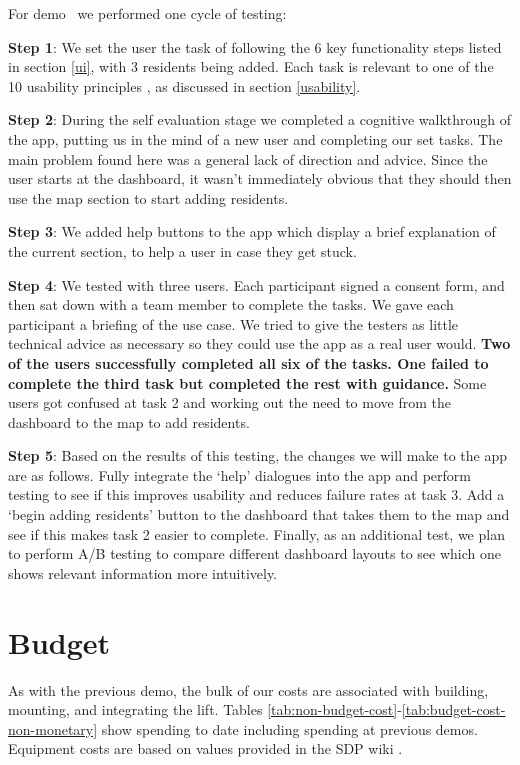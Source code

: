 \documentclass{article}
\begin{document}
For demo \demoNumber\ we performed one cycle of testing:

{\bf Step 1}: We set the user the task of following the 6 key functionality steps listed in section \ref{ui}, with 3 residents being added. Each task is relevant to one of the 10 usability principles \cite{heuristics}, as discussed in section \ref{usability}.

{\bf Step 2}: During the self evaluation stage we completed a cognitive walkthrough of the app, putting us in the mind of a new user and completing our set tasks. The main problem found here was a general lack of direction and advice. Since the user starts at the dashboard, it wasn't immediately obvious that they should then use the map section to start adding residents.

{\bf Step 3}: We added help buttons to the app which display a brief explanation of the current section, to help a user in case they get stuck.

{\bf Step 4}: We tested with three users. Each participant signed a consent form, and then sat down with a team member to complete the tasks. We gave each participant a briefing of the use case. We tried to give the testers as little technical advice as necessary so they could use the app as a real user would. {\bf Two of the users successfully completed all six of the tasks. One failed to complete the third task but completed the rest with guidance.} Some users got confused at task 2 and working out the need to move from the dashboard to the map to add residents.

{\bf Step 5}: Based on the results of this testing, the changes we will make to the app are as follows. Fully integrate the `help' dialogues into the app and perform testing to see if this improves usability and reduces failure rates at task 3. Add a `begin adding residents' button to the dashboard that takes them to the map and see if this makes task 2 easier to complete. Finally, as an additional test, we plan to perform A/B testing to compare different dashboard layouts to see which one shows relevant information more intuitively. 

\section{Budget}
\label{budget}
As with the previous demo, the bulk of our costs are associated with building, mounting, and integrating the lift. Tables \ref{tab:non-budget-cost}-\ref{tab:budget-cost-non-monetary} show spending to date including spending at previous demos. Equipment costs are based on values provided in the SDP wiki \cite{sdpcosts}.
\end{document}
